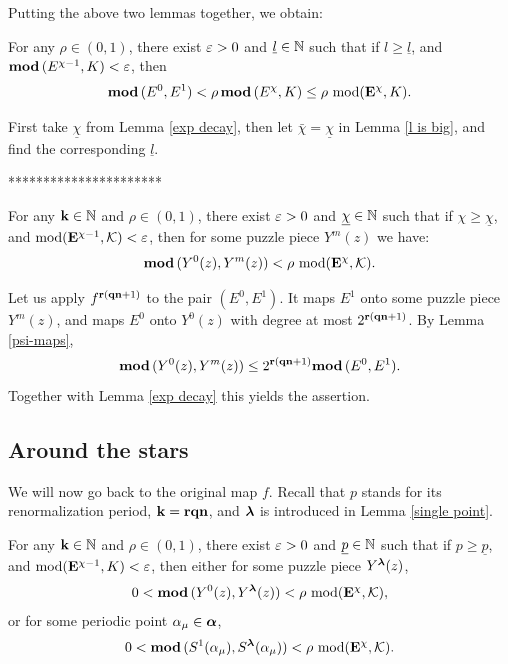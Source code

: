 {Putting the above two lemmas together, we obtain:


 \begin{cor}\label{l is big - 2}
   For any $\rho\in (0,1)$, there exist ${\varepsilon}>0$ and $\underline l\in {\mathbb N}$
such that if  $l\geq \underline{l}$, 
and ${ \mathbf{mod}\, }(E^{\chi-1}, K)<{\varepsilon}$, then 
$$
   { \mathbf{mod}\, }(E^0, E^1)<  \rho\, { \mathbf{mod}\, }(E^\chi, K) \leq  \rho\, \operatorname{mod}({\mathbf{E}}^\chi, K).
$$  
\end{cor}

\begin{pf}
  First take $\underline{\chi}$ from Lemma \ref{exp decay},
then let $\bar\chi=\underline{\chi}$ in Lemma \ref{l is big},
and find the corresponding $\underline l$.
\end{pf}

**********************}

 \begin{cor}\label{l is big - 3}
   For any ${\mathbf{k}}\in {\mathbb N}$ and $\rho\in (0,1)$, there exist ${\varepsilon}>0$ and $\underline \chi\in {\mathbb N}$
such that if  $\chi\geq \underline{\chi}$, 
and $\operatorname{mod}({\mathbf{E}}^{\chi-1}, {\mathcal K})<{\varepsilon}$, then for some puzzle piece $Y^m(z)$ we have:  
$$
   { \mathbf{mod}\, }(Y^0(z), Y^m (z))<  \rho\, \operatorname{mod}({\mathbf{E}}^\chi, {\mathcal K}).
$$  
\end{cor}

\begin{pf}
Let us apply $f^{{\mathbf{r}}({\mathbf{q}}{\mathbf{n}}+1)}$ to the pair $(E^0, E^1)$. 
It maps $E^1$ onto some puzzle piece $Y^m (z)$, and maps $E^0$ onto $Y^0(z)$ with degree at most 
$2^{{\mathbf{r}}({\mathbf{q}}{\mathbf{n}}+1)}$. 
By Lemma \ref{psi-maps}, 
$$
     { \mathbf{mod}\, }( Y^0(z), Y^m (z))  \leq  2^{{\mathbf{r}}({\mathbf{q}}{\mathbf{n}}+1)}  { \mathbf{mod}\, } ( E^0, E^1).
$$
Together with Lemma \ref{exp decay} this yields the assertion.
\end{pf}


\subsection{Around the stars}
  
We will now go back to the original map $f$. 
Recall that $p$ stands for its renormalization period,
${\mathbf{k}}={\mathbf{r}}{\mathbf{q}}{\mathbf{n}}$, and ${\boldsymbol{\lambda}}$ is introduced in Lemma \ref{single point}. 

\begin{lem}\label{p is big}
   For any ${\mathbf{k}}\in {\mathbb N}$ and $\rho\in (0,1)$, there exist ${\varepsilon}>0$ and $\underline p\in {\mathbb N}$
such that if  $p\geq \underline{p}$, 
and $\operatorname{mod}({\mathbf{E}}^{\chi-1}, K)<{\varepsilon}$, 
then either for some puzzle piece $Y^{{\boldsymbol{\lambda}}}(z)$,  
$$
    0 <  { \mathbf{mod}\, }(Y^0(z), Y^{{\boldsymbol{\lambda}}} (z))<  \rho\, \operatorname{mod}({\mathbf{E}}^\chi, {\mathcal K}),
$$  
or for some periodic point $\alpha_\mu\in {\mbox{\boldmath$\alpha$} }$, 
$$
    0< { \mathbf{mod}\, }(S^1(\alpha_\mu), S^{{\boldsymbol{\lambda}}}(\alpha_\mu)) <  \rho\, \operatorname{mod}({\mathbf{E}}^\chi, {\mathcal K}).
$$

\end{lem}

